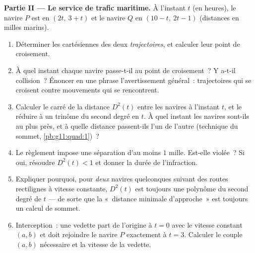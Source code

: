 \begin{problem}
\medskip
\noindent\textbf{Partie II --- Le service de trafic maritime.}
À l'instant $t$ (en heures), le navire $P$ est en $(2t,\ 3 + t)$ et
le navire $Q$ en $(10 - t,\ 2t - 1)$ (distances en milles marins).
\begin{enumerate}[resume]
  \item Déterminer les  cartésiennes des deux
        \emph{trajectoires}, et calculer leur point de croisement.
  \item À quel instant chaque navire passe-t-il au point de
        croisement~? Y a-t-il collision~? Énoncer en une phrase
        l'avertissement général~: trajectoires qui se croisent
        contre mouvements qui se rencontrent.
  \item Calculer le carré de la distance $D^2(t)$ entre les navires
        à l'instant $t$, et le réduire à un trinôme du second degré
        en $t$. À quel instant les navires sont-ils au plus près, et
        à quelle distance passent-ils l'un de l'autre (technique du
        sommet, \cref{pb:g11:quad:1})~?
  \item Le règlement impose une séparation d'au moins $1$ mille.
        Est-elle violée~? Si oui, résoudre $D^2(t) < 1$ et donner la
        durée de l'infraction.
  \item Expliquer pourquoi, pour \emph{deux} navires quelconques
        suivant des routes rectilignes à vitesse constante, $D^2(t)$
        est toujours une  polynôme du second degré de $t$
        --- de sorte que la «~distance minimale d'approche~» est
        toujours un calcul de sommet.
  \item Interception~: une vedette part de l'origine à $t = 0$ avec
        le  vitesse constant $(a, b)$ et doit rejoindre le
        navire $P$ exactement à $t = 3$. Calculer le couple
        $(a, b)$ nécessaire et la vitesse de la vedette.
\end{enumerate}


\end{problem}
